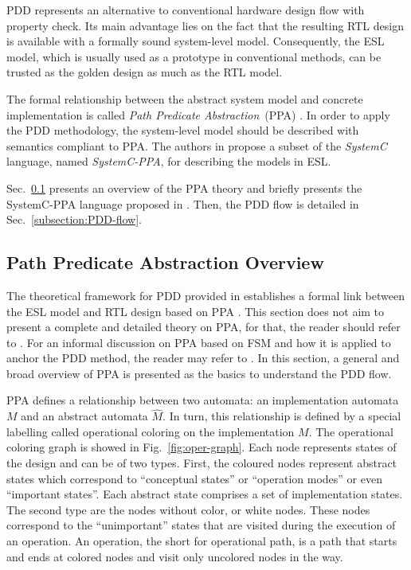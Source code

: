 PDD represents an alternative to conventional hardware design flow with property check. Its main advantage lies on the fact that the resulting RTL design is available with a formally sound system-level model. Consequently, the ESL model, which is usually used as a prototype in conventional methods, can be trusted as the golden design as much as the RTL model. 

The formal relationship between the abstract system model and concrete implementation is called \textit{Path Predicate Abstraction}~(PPA) \cite{paper-ppa}. In order to apply the PDD methodology, the system-level model should be described with semantics compliant to PPA. The authors in \cite{paper-pdd} propose a subset of the \textit{SystemC} language, named \textit{SystemC-PPA}, for describing the models in ESL.

Sec.~\ref{subsection:PPA} presents an overview of the PPA theory and briefly presents the SystemC-PPA language proposed in \cite{paper-pdd}. Then, the PDD flow is detailed in Sec.~\ref{subsection:PDD-flow}.

\subsection{Path Predicate Abstraction Overview}
\label{subsection:PPA}

The theoretical framework for PDD provided in \cite{paper-pdd} establishes a formal link between the ESL model and RTL design based on PPA \cite{paper-ppa}. This section does not aim to present a complete and detailed theory on PPA, for that, the reader should refer to \cite{paper-ppa}. For an informal discussion on PPA based on FSM and how it is applied to anchor the PDD method, the reader may refer to \cite{paper-pdd}. In this section, a general and broad overview of PPA is presented as the basics to understand the PDD flow.

PPA defines a relationship between two automata: an implementation automata $M$ and an abstract automata $\hat{M}$. In turn, this relationship is defined by a special labelling called operational coloring on the implementation $M$. The operational coloring graph is showed in Fig.~\ref{fig:oper-graph}. Each node represents states of the design and can be of two types. First, the coloured nodes represent abstract states which correspond to “conceptual states” or “operation modes” or even “important states”. Each abstract state comprises a set of implementation states. The second type are the nodes without color, or white nodes. These nodes correspond to the “unimportant” states that are visited during the execution of an operation. An operation, the short for operational path, is a path that starts and ends at colored nodes and visit only uncolored nodes in the way.

